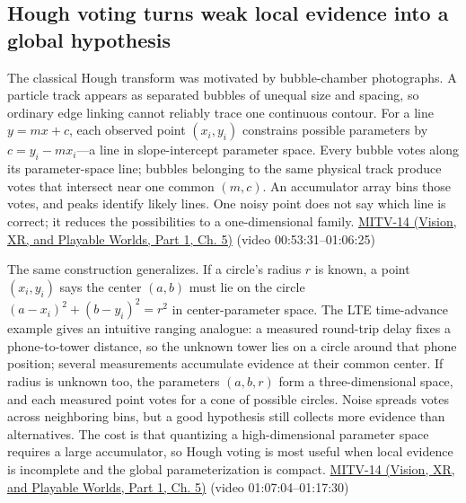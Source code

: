 \subsection{Hough voting turns weak local evidence into a global hypothesis}\label{04-visual-computing-ii-ch030-hough-voting-turns-weak-local-evidence-into-a-global-hypothesis}

\hypertarget{04-visual-computing-ii-ch030-hough-voting-turns-weak-local-evidence-into-a-global-hypothesis}{}

The classical Hough transform was motivated by bubble-chamber photographs. A particle track appears as separated bubbles of unequal size and spacing, so ordinary edge linking cannot reliably trace one continuous contour. For a line \(y=mx+c\), each observed point \((x_i,y_i)\) constrains possible parameters by \(c=y_i-mx_i\)---a line in slope-intercept parameter space. Every bubble votes along its parameter-space line; bubbles belonging to the same physical track produce votes that intersect near one common \((m,c)\). An accumulator array bins those votes, and peaks identify likely lines. One noisy point does not say which line is correct; it reduces the possibilities to a one-dimensional family. \href{../07-Vision-XR-and-Playable-Worlds-P01/main.pdf\#nameddest=04-visual-computing-ii-ch036-mitv-14---inspection-in-patquick-hough-transform-homography-position-determination-multi-scale}{MITV-14 (Vision, XR, and Playable Worlds, Part 1, Ch. 5)} (video 00:53:31--01:06:25)

The same construction generalizes. If a circle's radius \(r\) is known, a point \((x_i,y_i)\) says the center \((a,b)\) must lie on the circle \((a-x_i)^2+(b-y_i)^2=r^2\) in center-parameter space. The LTE time-advance example gives an intuitive ranging analogue: a measured round-trip delay fixes a phone-to-tower distance, so the unknown tower lies on a circle around that phone position; several measurements accumulate evidence at their common center. If radius is unknown too, the parameters \((a,b,r)\) form a three-dimensional space, and each measured point votes for a cone of possible circles. Noise spreads votes across neighboring bins, but a good hypothesis still collects more evidence than alternatives. The cost is that quantizing a high-dimensional parameter space requires a large accumulator, so Hough voting is most useful when local evidence is incomplete and the global parameterization is compact. \href{../07-Vision-XR-and-Playable-Worlds-P01/main.pdf\#nameddest=04-visual-computing-ii-ch036-mitv-14---inspection-in-patquick-hough-transform-homography-position-determination-multi-scale}{MITV-14 (Vision, XR, and Playable Worlds, Part 1, Ch. 5)} (video 01:07:04--01:17:30)

